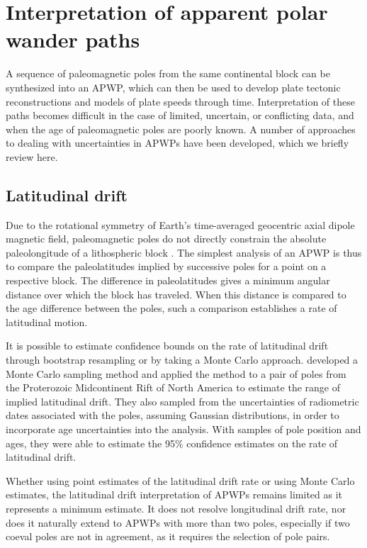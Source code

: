 \documentclass[11pt,letterpaper]{article}
\begin{document}
\section*{Interpretation of apparent polar wander paths}

A sequence of paleomagnetic poles from the same continental block can be synthesized into an APWP, which can then be used to develop plate tectonic reconstructions and models of plate speeds through time. Interpretation of these paths becomes difficult in the case of limited, uncertain, or conflicting data, and when the age of paleomagnetic poles are poorly known. A number of approaches to dealing with uncertainties in APWPs have been developed, which we briefly review here.

\subsection*{Latitudinal drift}
Due to the rotational symmetry of Earth's time-averaged geocentric axial dipole magnetic field, paleomagnetic poles do not directly constrain the absolute paleolongitude of a lithospheric block \citep{Butler1992a}. The simplest analysis of an APWP is thus to compare the paleolatitudes implied by successive poles for a point on a respective block. The difference in paleolatitudes gives a minimum angular distance over which the block has traveled.  When this distance is compared to the age difference between the poles, such a comparison establishes a rate of latitudinal motion.

It is possible to estimate confidence bounds on the rate of latitudinal drift through bootstrap resampling \citep[e.g.][]{Tarduno1990b} or by taking a Monte Carlo approach. \cite{Swanson-Hysell2014b} developed a Monte Carlo sampling method and applied the method to a pair of poles from the Proterozoic Midcontinent Rift of North America to estimate the range of implied latitudinal drift. They also sampled from the uncertainties of radiometric dates associated with the poles, assuming Gaussian distributions, in order to incorporate age uncertainties into the analysis. With samples of pole position and ages, they were able to estimate the 95\% confidence estimates on the rate of latitudinal drift.

Whether using point estimates of the latitudinal drift rate or using Monte Carlo estimates, the latitudinal drift interpretation of APWPs remains limited as it represents a minimum estimate. It does not resolve longitudinal drift rate, nor does it naturally extend to APWPs with more than two poles, especially if two coeval poles are not in agreement, as it requires the selection of pole pairs.
\end{document}
